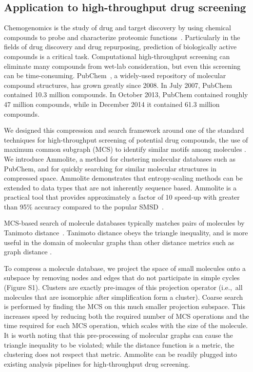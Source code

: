 \documentclass[review,preprint,12pt]{elsarticle}
\renewcommand{\cite}{\citep} %
\theoremstyle{definition}
\theoremstyle{remark}
\numberwithin{equation}{section}
\begin{document}
\subsection{Application to high-throughput drug screening}

Chemogenomics is the study of drug and target discovery by using chemical
compounds to probe and characterize proteomic 
functions~\cite{bredel2004chemogenomics}.
Particularly in the fields of drug discovery and drug repurposing, prediction 
of biologically active compounds is a critical task. 
Computational high-throughput screening can eliminate many compounds from 
wet-lab consideration, but even this screening can be time-consuming.
PubChem~\cite{bolton2008pubchem}, a widely-used repository of molecular compound 
structures, 
has grown greatly since 2008. 
In July 2007, PubChem contained 10.3 million compounds.
In October 2013, PubChem contained roughly 47 million compounds, while
in December 2014 it contained 61.3 million compounds.

We designed this compression and search framework around one of the standard 
techniques for high-throughput screening of potential drug compounds, the use 
of maximum common subgraph (MCS) to identify similar motifs among molecules \cite{cao2008maximum, rahman2009small}.
We introduce Ammolite, a method for clustering molecular databases such as 
PubChem, and for quickly searching for 
similar molecular structures in compressed space.
Ammolite demonstrates that entropy-scaling methods can be extended to data types that are not inherently sequence based.
Ammolite is a practical 
tool that provides approximately a factor of 10 speed-up with greater than 95\% accuracy compared to the popular SMSD~\cite{rahman2009small}.

MCS-based search of molecule databases typically matches pairs of molecules by 
Tanimoto distance~\cite{rahman2009small}. 
Tanimoto distance obeys the triangle inequality, and is more useful in the 
domain of molecular graphs than other
distance metrics such as graph distance \cite{bunke1998graph}.

To compress a molecule database, we project the space of small molecules onto a subspace by removing nodes and edges that do not participate in simple cycles
(Figure S1).
Clusters are exactly pre-images of this projection operator (i.e.,~all molecules that are isomorphic after simplification form a cluster).
Coarse search is performed by finding the MCS on this much smaller projection subspace. This increases speed by reducing both the required number of MCS operations 
and the time required for each MCS operation, which scales with the size of the molecule.
It is worth noting that this pre-processing of molecular graphs can cause the 
triangle inequality to be violated; while the distance function is a metric, the
clustering does not respect that metric.
Ammolite can be readily plugged into existing analysis pipelines for 
high-throughput drug screening.
\end{document}
